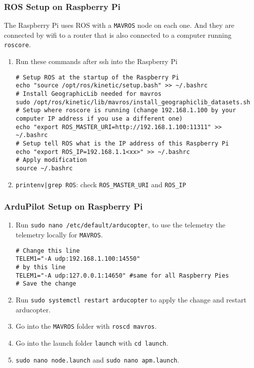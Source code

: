 \subsubsection{ROS Setup on Raspberry Pi}

The Raspberry Pi uses ROS with a \texttt{MAVROS} node on each one. And they are connected by wifi to a router that is also connected to a computer running \texttt{roscore}.
\begin{enumerate}
    \item Run these commands after ssh into the Raspberry Pi

          \begin{verbatim}
# Setup ROS at the startup of the Raspberry Pi
echo "source /opt/ros/kinetic/setup.bash" >> ~/.bashrc
# Install GeographicLib needed for mavros
sudo /opt/ros/kinetic/lib/mavros/install_geographiclib_datasets.sh
# Setup where roscore is running (change 192.168.1.100 by your computer IP address if you use a different one)
echo "export ROS_MASTER_URI=http://192.168.1.100:11311" >> ~/.bashrc
# Setup tell ROS what is the IP address of this Raspberry Pi
echo "export ROS_IP=192.168.1.1<xx>" >> ~/.bashrc
# Apply modification
source ~/.bashrc
                    \end{verbatim}
    \item \texttt{printenv|grep ROS}: check \texttt{ROS\_MASTER\_URI} and \texttt{ROS\_IP}
\end{enumerate}

\subsubsection{ArduPilot Setup on Raspberry Pi}
\begin{enumerate}
    \item Run \texttt{sudo nano /etc/default/arducopter}, to use the telemetry the telemetry locally for \texttt{MAVROS}.

          \begin{verbatim}
# Change this line
TELEM1="-A udp:192.168.1.100:14550"
# by this line
TELEM1="-A udp:127.0.0.1:14650" #same for all Raspberry Pies
# Save the change
          \end{verbatim}

    \item Run \texttt{sudo systemctl restart arducopter} to apply the change and restart arducopter.
    \item Go into the \texttt{MAVROS} folder with \texttt{roscd mavros}.
    \item Go into the launch folder \texttt{launch} with \texttt{cd launch}.
    \item \texttt{sudo nano node.launch} and \texttt{sudo nano apm.launch}.
\end{enumerate}

